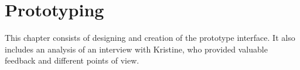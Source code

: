\chapter{Prototyping}
This chapter consists of designing and creation of the prototype interface. It also includes an analysis of an interview with Kristine, who provided valuable feedback and different points of view.